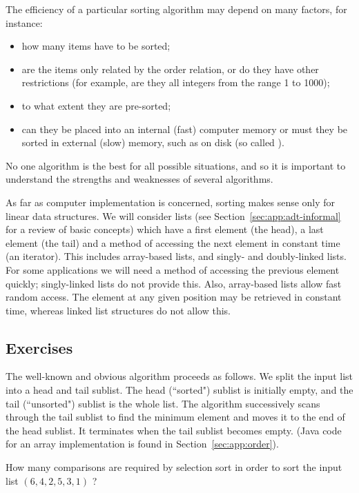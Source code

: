 The efficiency of a particular sorting algorithm may depend on many factors, 
for instance:

\begin{itemize}
\item how many items have to be sorted;
\item are the items only related by the order relation, or do they have other 
restrictions (for example, are they all integers from the range 1 to 1000);
\item to what extent they are pre-sorted;
\item can they be placed into an internal (fast) computer memory or must they be
sorted in external (slow) memory, such as on disk (so called 
).
\end{itemize}

No one algorithm is the best for all possible situations, and so it is important
to understand the strengths and weaknesses of several algorithms.

As far as computer implementation is concerned, sorting makes sense only for 
linear data structures. We will consider lists (see Section~\ref{sec:app:adt-informal} 
for a review of basic concepts) which have a first element (the head), a last 
element (the tail) and a method of accessing the next element in constant time 
(an iterator). This includes array-based lists, and singly- and doubly-linked 
lists. For some applications we will need a method of accessing the previous 
element quickly; singly-linked lists do not provide this. Also, array-based 
lists allow fast random access. The element at any given position may be 
retrieved in constant time, whereas linked list structures do not allow this. 

\subsection*{Exercises}

\begin{Exercise}\label{exr:selection-sort-do} 
The  well-known and obvious  algorithm 
proceeds as follows.
We split the input list into a head and tail sublist. The head (``sorted") sublist is 
initially empty, and the tail (``unsorted") sublist is the whole list. 
The algorithm successively scans through the tail sublist to find the minimum 
element and moves it to the end of the head sublist. It terminates when the 
tail sublist becomes empty. (Java code for an array implementation is found 
in Section~\ref{sec:app:order}).

How many comparisons are required by selection sort in order to sort the input list 
$(6,4,2,5,3,1)$ ?  
\end{Exercise}

